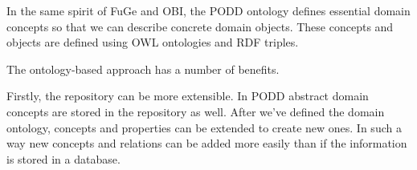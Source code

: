 \documentclass[ignorenonframetext,compress]{beamer}
\begin{document}
In the same spirit of FuGe and OBI, the PODD ontology defines 
essential domain concepts so that we can describe concrete domain
objects. These concepts and objects are defined using OWL ontologies
and RDF triples.


The ontology-based approach has a number of benefits. 

Firstly, the repository can be more extensible. In PODD abstract
domain concepts are stored in the repository as well. After we've 
defined the domain ontology, concepts and properties can be extended 
to create new ones. In such a way new concepts and relations
can be added more easily than if the information is stored in a database.
\end{document}

